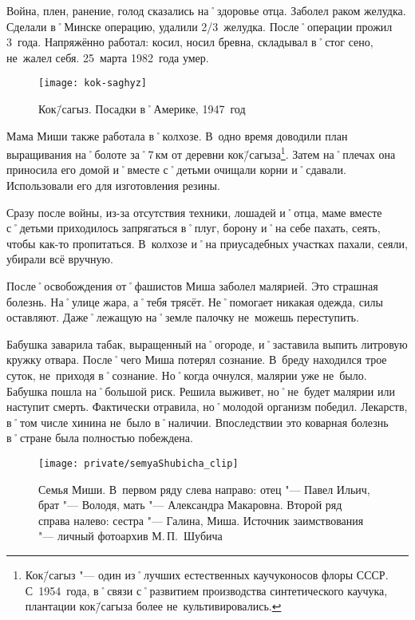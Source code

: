 Война, плен, ранение, голод сказались на˚здоровье отца. Заболел раком желудка. Сделали в˚Минске операцию, удалили 2/3~желудка. После˚операции прожил 3~года. Напряжённо работал: косил, носил бревна, складывал в˚стог сено, не~жалел себя. 25~марта 1982~года умер.

\begin{wrapfigure}{O}{.4\textwidth}
\centering
\texttt{[image: kok-saghyz]}
\caption[Кок\=/сагыз. Посадки в˚Америке, 1947~год]{Кок\=/сагыз. Посадки в˚Америке, 1947~год\footnotemark}
\label{fig:kok-saghyz}
\end{wrapfigure}

Мама Миши также работала в˚колхозе. В~одно время доводили план выращивания на˚болоте за˚7\,км от деревни кок\=/сагыза\footnote{Кок\=/сагыз "--- один из˚лучших естественных каучуконосов флоры СССР. С~1954~года, в˚связи с˚развитием производства синтетического каучука, плантации кок\=/сагыза более не~культивировались.}. Затем на˚плечах она приносила его домой и˚вместе с˚детьми очищали корни и˚сдавали. Использовали его для изготовления резины.

Сразу после войны, из-за отсутствия техники, лошадей и˚отца, маме вместе с˚детьми приходилось запрягаться в˚плуг, борону и˚на себе пахать, сеять, чтобы как-то пропитаться. В~колхозе и˚на приусадебных участках пахали, сеяли, убирали всё вручную.

После˚освобождения от˚фашистов Миша заболел малярией. Это страшная болезнь. На˚улице жара, а˚тебя трясёт. Не˚помогает никакая одежда, силы оставляют. Даже˚лежащую на˚земле палочку не~можешь переступить. 

Бабушка заварила табак, выращенный на˚огороде, и˚заставила выпить литровую кружку отвара. После˚чего Миша потерял сознание. В~бреду находился трое суток, не~приходя в˚сознание. Но˚когда очнулся, малярии уже не~было. Бабушка пошла на˚большой риск. Решила выживет, но˚не~будет малярии или наступит смерть. Фактически отравила, но˚молодой организм победил. Лекарств, в˚том числе хинина не~было в˚наличии. Впоследствии это коварная болезнь в˚стране была полностью побеждена.

\begin{figure}[h]
\texttt{[image: private/semyaShubicha\_clip]}
\caption{Семья Миши. В~первом ряду слева направо: отец "--- Павел Ильич, брат "--- Володя, мать "--- Александра Макаровна. Второй ряд справа налево: сестра "--- Галина, Миша. Источник заимствования "--- личный фотоархив М.\,П.~Шубича}
\label{fig:semyaShubicha}
\end{figure}

